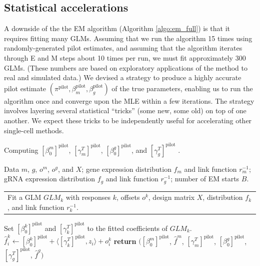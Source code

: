 \documentclass[12pt]{article}
\makeatletter
\newcommand{\multiline}[1]{%
	\begin{tabularx}{\dimexpr\linewidth-\ALG@thistlm}[t]{@{}X@{}}
		#1
	\end{tabularx}
}
\makeatother
\begin{document}
\subsection{Statistical accelerations}
A downside of the the EM algorithm (Algorithm \ref{algo:em_full}) is that it requires fitting many GLMs. Assuming that we run the algorithm 15 times using randomly-generated pilot estimates, and assuming that the algorithm iterates through E and M steps about 10 times per run, we must fit approximately 300 GLMs. (These numbers are based on exploratory applications of the method to real and simulated data.) We devised a strategy to produce a highly accurate pilot estimate $(\pi^\textrm{pilot}, \beta_m^\textrm{pilot}, \beta_g^\textrm{pilot})$ of the true parameters, enabling us to run the algorithm once and converge upon the MLE within a few iterations. The strategy involves layering several statistical ``tricks'' (some new, some old) on top of one another. We expect these tricks to be independently useful for accelerating other single-cell methods.

\begin{algorithm}
	\caption{Computing $[\beta_0^m]^\textrm{pilot}$, $[\gamma^T_m]^\textrm{pilot}$, $[\beta_0^g]^\textrm{pilot}$, and $[\gamma^T_g]^\textrm{pilot}$ .}\label{algo:pilot_estimates_1}
	\begin{algorithmic}[2]
		\Require Data $m$, $g$, $o^m$, $o^g$, and $X$; gene expression distribution $f_m$ and link function $r^{-1}_m$; gRNA expression distribution $f_g$ and link function $r^{-1}_g$; number of EM starts $B$.
		\State \multiline{Fit a GLM $GLM_k$ with responses $k$, offsets $o^k$, design matrix $X$, distribution $f_k$, and link function $r^{-1}_k$.}
		\State Set $[\beta_0^k]^\textrm{pilot}$ and $[\gamma_k^T]^\textrm{pilot}$ to the fitted coefficients of $GLM_k$.
		\State $\hat{f}^k_i \gets [\beta_0^k]^\textrm{pilot} + \langle [\gamma_k^T]^\textrm{pilot} , z_i \rangle + o_i^k$ 
		\EndFor
		\EndFor
		\State \textbf{return} $([\beta_0^m]^\textrm{pilot}$, $\hat{f}^m$, $[\gamma^T_m]^\textrm{pilot}$, $[\beta_0^g]^\textrm{pilot}$, $[\gamma^T_g]^\textrm{pilot}$, $\hat{f}^g)$
	\end{algorithmic}
\end{algorithm}
\end{document}

